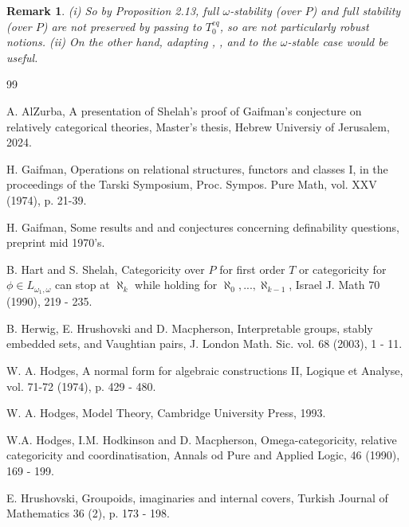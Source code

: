 \documentclass[12pt]{article}
\newtheorem{Remark}[Theorem]{Remark}
\begin{document}
\begin{Remark} (i) So by  Proposition 2.13, full $\omega$-stability (over $P$) and full stability (over $P$) are not preserved by passing to $T_{0}^{eq}$, so are not particularly robust notions.
\newline
(ii)  On the other hand, adapting \cite{Pillay-Shelah}, \cite{Shelah-classification-II}, and \cite{S-U} to the $\omega$-stable case would be useful. 



\end{Remark} 




\begin{thebibliography}{99}

 A. AlZurba, A presentation of Shelah's proof of Gaifman's conjecture on relatively categorical theories, Master's thesis,  Hebrew Universiy of Jerusalem, 2024. 


 H. Gaifman, Operations on relational structures, functors and classes I, in the proceedings of the Tarski Symposium, Proc. Sympos. Pure Math, vol. XXV (1974), p. 21-39. 

 H. Gaifman,  Some results and and conjectures concerning definability questions, preprint mid 1970's. 

  B. Hart and S. Shelah,  Categoricity over $P$ for first order $T$ or categoricity for $\phi\in L_{\omega_{1},\omega}$ can stop at $\aleph_{k}$ while holding for $\aleph_{0},...,\aleph_{k-1}$, Israel J. Math 70 (1990), 219 - 235. 

 B. Herwig, E. Hrushovski and D. Macpherson, Interpretable groups, stably embedded sets, and Vaughtian pairs, J. London Math. Sic. vol. 68 (2003), 1 - 11. 

 W. A. Hodges, A normal form for algebraic constructions II, Logique et Analyse, vol. 71-72  (1974), p. 429 - 480. 

  W. A. Hodges, Model Theory,  Cambridge University Press, 1993. 

 W.A. Hodges, I.M. Hodkinson and D. Macpherson,  Omega-categoricity, relative categoricity and coordinatisation, Annals od Pure and Applied Logic, 46 (1990), 169 - 199. 

 E. Hrushovski, Groupoids, imaginaries and internal covers, Turkish Journal of Mathematics 36 (2), p. 173 - 198. 


\end{thebibliography}
\end{document}
